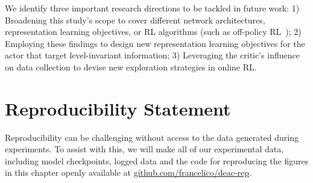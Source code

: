 We identify three important research directions to be tackled in future work: 1) Broadening this study's scope to cover different network architectures, representation learning objectives, or RL algorithms (such as off-policy RL~\citep{SAC}); 2) Employing these findings to design new representation learning objectives for the actor that target level-invariant information; 3) Leveraging the critic's influence on data collection to devise new exploration strategies in online RL.

%
\section*{Reproducibility Statement}
Reproducibility can be challenging without access to the data generated during experiments. To assist with this, we will make all of our experimental data, including model checkpoints, logged data and the code for reproducing the figures in this chapter openly available at \href{https://github.com/francelico/deac-rep}{github.com/francelico/deac-rep}.




\clearpage
\begin{subappendices}

\end{subappendices}
